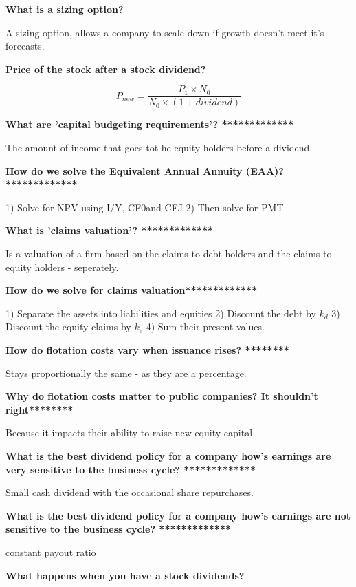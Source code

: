 \documentclass[12pt]{article}
\begin{document}
	\textbf{What is a sizing option?}
	
	A sizing option, allows a company to scale down if growth doesn't meet it's forecasts.
	
	\textbf{Price of the stock after a stock dividend?}
	
	$$
	P_{new} = \dfrac{P_1 \times N_0} {N_0 \times (1 + dividend)}
	$$
	
	\textbf{What are 'capital budgeting requirements'? *************}
	
	The amount of income that goes tot he equity holders before a dividend. 
	
	\textbf{How do we solve the Equivalent Annual Annuity (EAA)? *************}
	
	1) Solve for NPV using I/Y, CF0and CFJ
	2) Then solve for PMT
	
	\textbf{What is 'claims valuation'? *************}
	
	Is a valuation of a firm based on the claims to debt holders and the claims to equity holders - seperately.
	
	\textbf{How do we solve for claims valuation*************}
	
	1) Separate the assets into liabilities and equities
	2) Discount the debt by $k_d$
	3) Discount the equity claims by $k_e$
	4) Sum their present values. 
	
	\textbf{How do flotation costs vary when issuance rises? ********}
	
	Stays proportionally the same - as they are a percentage.
	
	\textbf{Why do flotation costs matter to public companies? It shouldn't right********}
	
	Because it impacts their ability to raise new equity capital
	
	\begin{framed}
	
	\textbf{What is the best dividend policy for a company how's earnings are very sensitive to the business cycle? *************}
	
	Small cash dividend with the occasional share repurchases. 
	
	\textbf{What is the best dividend policy for a company how's earnings are not sensitive to the business cycle? *************}
	
	constant payout ratio
	
	\end{framed}
	
	
	
	\textbf{What happens when you have a stock dividends?}
	
\end{document}

